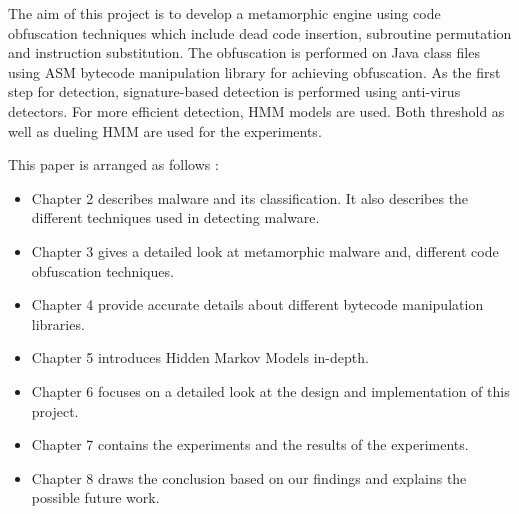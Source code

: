 The aim of this project is to develop a metamorphic engine using code obfuscation techniques which include  dead code insertion, subroutine permutation and instruction substitution. The obfuscation is performed on Java class files using ASM bytecode manipulation library for achieving obfuscation. As the first step for detection, signature-based detection is performed using anti-virus detectors. For more efficient detection, HMM models are used. Both threshold as well as dueling HMM are used for the experiments.
 
This paper is arranged as follows :
\begin{itemize}
\item Chapter 2 describes malware and its classification. It also describes the different techniques used in detecting malware. 
\item Chapter 3 gives a detailed look at metamorphic malware and, different code obfuscation techniques. 
\item Chapter 4 provide accurate details about different bytecode manipulation libraries.
\item Chapter 5 introduces Hidden Markov Models in-depth. 
\item Chapter 6 focuses on a detailed look at the design and implementation of this project.
\item Chapter 7 contains the experiments and the results of the experiments.
\item Chapter 8 draws the conclusion based on our findings and explains the possible future work.

\end{itemize}
